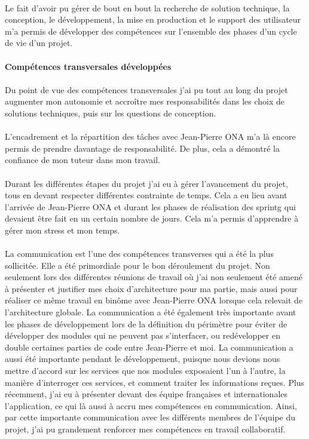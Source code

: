 \documentclass[12pt,a4paper]{report}
\begin{document}
\paragraph*{}Le fait d'avoir pu gérer de bout en bout la recherche de solution technique, la conception, le développement, la mise en production et le support des utilisateur m'a permis de développer des compétences sur l'ensemble des phases d'un cycle de vie d'un projet. \\
\paragraph{Compétences transversales développées}
\paragraph*{}Du point de vue des compétences transversales j'ai pu tout au long du projet augmenter mon autonomie et accroître mes responsabilités dans les choix de solutions techniques, puis sur les questions de conception.
\paragraph*{}L'encadrement et la répartition des tâches avec Jean-Pierre ONA m'a là encore permis de prendre davantage de responsabilité. De plus, cela a démontré la confiance de mon tuteur dans mon travail.
\paragraph*{}Durant les différentes étapes du projet j'ai eu à gérer l'avancement du projet, tous en devant respecter différentes contrainte de temps. Cela a eu lieu avant l'arrivée de Jean-Pierre ONA et durant les phases de réalisation des \gls{sprintg} qui devaient être fait en un certain nombre de jours. Cela m'a permis d'apprendre à gérer mon stress et mon temps.
\paragraph*{}La communication est l’une des compétences transverses qui a été la plus
sollicitée. Elle a été primordiale pour le bon déroulement du projet. Non seulement lors des différentes réunions de travail où j’ai non seulement été amené à présenter et justifier mes choix d’architecture pour ma partie, mais aussi pour réaliser ce même travail en binôme avec Jean-Pierre ONA lorsque cela relevait de l’architecture globale. La communication a été également très importante avant les phases de développement lors de la définition du périmètre pour éviter de développer des modules qui ne peuvent pas s’interfacer, ou redévelopper en double certaines parties de code entre Jean-Pierre et moi. La communication a aussi été importante pendant le développement, puisque nous devions nous mettre d’accord sur les services que nos modules exposaient l’un à l’autre, la manière d’interroger ces services, et comment traiter les informations reçues. Plus récemment, j'ai eu à présenter devant des équipe françaises et internationales l'application, ce qui là aussi à accru mes compétences en communication. Ainsi, par cette importante communication avec les différents membres de l’équipe du projet, j’ai pu grandement renforcer mes compétences en travail collaboratif. 
\end{document}
